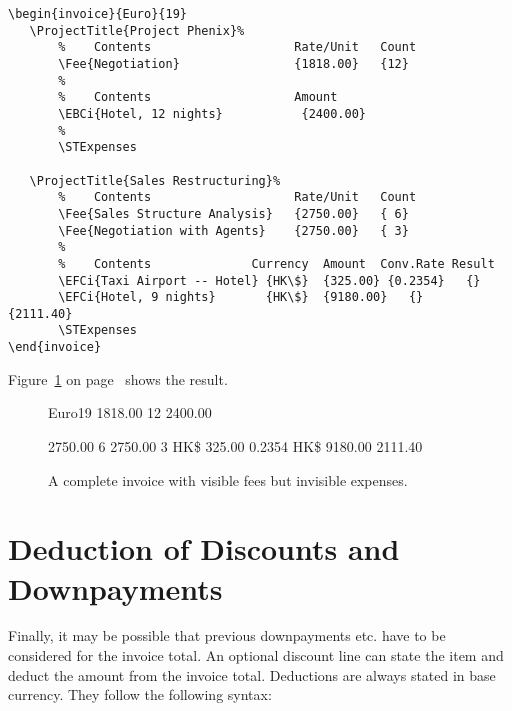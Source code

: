 \documentclass[11pt]{ltxdoc}
\begin{document}
\begin{verbatim}
\begin{invoice}{Euro}{19}
   \ProjectTitle{Project Phenix}%
       %    Contents                    Rate/Unit   Count
       \Fee{Negotiation}                {1818.00}   {12}
       %
       %    Contents                    Amount
       \EBCi{Hotel, 12 nights}           {2400.00}
       %
       \STExpenses

   \ProjectTitle{Sales Restructuring}%
       %    Contents                    Rate/Unit   Count
       \Fee{Sales Structure Analysis}   {2750.00}   { 6}
       \Fee{Negotiation with Agents}    {2750.00}   { 3}
       %
       %    Contents              Currency  Amount  Conv.Rate Result
       \EFCi{Taxi Airport -- Hotel} {HK\$}  {325.00} {0.2354}   {}
       \EFCi{Hotel, 9 nights}       {HK\$}  {9180.00}   {}    {2111.40}
       \STExpenses
\end{invoice}
\end{verbatim}

Figure~\ref{invoice_with_hidden_expenses} on
page~\pageref{invoice_with_hidden_expenses}
shows the result.

\begin{figure}[h]
\begin{invoice}{Euro}{19}
       		{1818.00}	{12}
       		{2400.00}
       \STExpenses

          {2750.00}   { 6}
           {2750.00}   { 3}
        {HK\$}  {325.00} {0.2354}   {}
              {HK\$}  {9180.00}   {} {2111.40}
       \STExpenses
\end{invoice}
\caption{A complete invoice with visible fees
		but invisible expenses.\label{invoice_with_hidden_expenses}}
\end{figure}


\section{Deduction of Discounts and Downpayments}

Finally, it may be possible that previous downpayments etc. have to 
be considered for the invoice total. An optional discount line
can state the item and deduct the amount from the invoice total.
Deductions are always stated in base currency. They follow the following
syntax:
\end{document}
